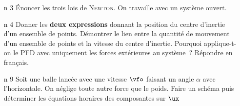 \documentclass[a4paper, 10pt, final, garamond]{book}
\begin{document}
\begin{enumerate}[label=\sqenumi]
\begin{minipage}{.39\linewidth}
\begin{center}
{			      }
		      \end{center}
	      \end{minipage}
	      \vspace{-15pt}
	\item[n]{3}%
	      Énoncer les trois lois de \textsc{Newton}. On travaille avec un système
	      ouvert.
	      \smallbreak
	      \vspace{-15pt}
	\item[n]{4}%
	      Donner les \textbf{deux expressions} donnant la position du centre
	      d'inertie d'un ensemble de points. Démontrer le lien entre la quantité
	      de mouvement d'un ensemble de points et la vitesse du centre d'inertie.
	      Pourquoi applique-t-on le PFD avec uniquement les forces extérieures au
	      système~? Répondre en français.
	      \smallbreak
	\item[n]{9}%
	      Soit une balle lancée avec une vitesse $\vfo$ faisant un angle $\alpha$
	      avec l'horizontale. On néglige toute autre force que le poids. Faire un
	      schéma puis déterminer les équations horaires des composantes sur $\ux$

\end{enumerate}
\end{document}

